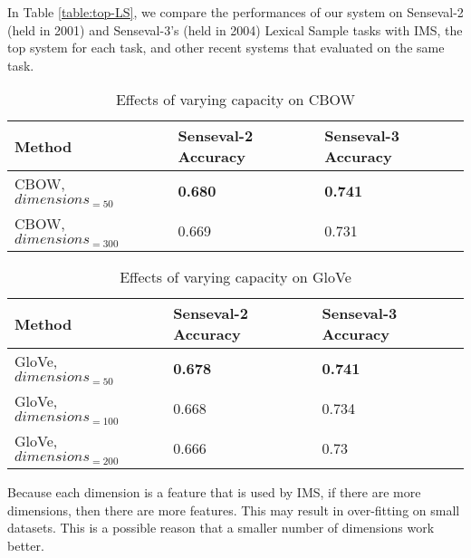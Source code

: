 In Table \ref{table:top-LS}, we compare the performances of our system on Senseval-2 (held in 2001) and Senseval-3's (held in 2004) Lexical Sample tasks with IMS, the top system for each task, and other recent systems that evaluated on the same task.


\begin{table}[ht]
	\caption{Effects of varying capacity on CBOW}
	\label{table:wordembeddings-word2vec-accuracy}
	\begin{center}
		\begin{tabular}{| p{7cm} | p{4cm} | p{4cm} |}
			\hline
			Method & Senseval-2 Accuracy & Senseval-3 Accuracy \\
			\hline
			CBOW, $dimensions_{=50}$ & {\bf0.680} & {\bf0.741} \\
			\hline
			CBOW, $dimensions_{=300}$ & 0.669 & 0.731 \\
			\hline
			
		\end{tabular}
	\end{center}
\end{table}

\begin{table}[ht]
	\caption{Effects of varying capacity on GloVe}
	\label{table:wordembeddings-glove-accuracy}
	\begin{center}
		\begin{tabular}{| p{7cm} | p{4cm} | p{4cm} |}
			\hline
			Method & Senseval-2 Accuracy & Senseval-3 Accuracy \\
			\hline
			GloVe, $dimensions_{=50}$ & {\bf0.678} & {\bf0.741} \\
			\hline
			GloVe, $dimensions_{=100}$ & 0.668 & 0.734 \\
			\hline
			GloVe, $dimensions_{=200}$ & 0.666 & 0.73 \\
			\hline
			
		\end{tabular}
	\end{center}
\end{table}



Because each dimension is a feature that is used by IMS, if there are more dimensions, then there are more features. This may result in over-fitting on small datasets. This is a possible reason that a smaller number of dimensions work better. 

